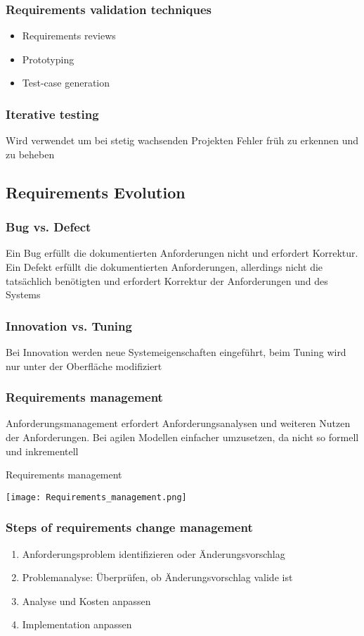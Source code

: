 \subsubsection{Requirements validation techniques}
\begin{itemize}
	\item Requirements reviews
	\item Prototyping
	\item Test-case generation
\end{itemize}
\subsubsection{Iterative testing}
Wird verwendet um bei stetig wachsenden Projekten Fehler früh zu erkennen und zu beheben
\subsection{Requirements Evolution}
\subsubsection{Bug vs. Defect}
Ein Bug erfüllt die dokumentierten Anforderungen nicht und erfordert Korrektur. Ein Defekt erfüllt die dokumentierten Anforderungen, allerdings nicht die tatsächlich benötigten und erfordert Korrektur der Anforderungen und des Systems
\subsubsection{Innovation vs. Tuning}
Bei Innovation werden neue Systemeigenschaften eingeführt, beim Tuning wird nur unter der Oberfläche modifiziert
\subsubsection{Requirements management}
Anforderungsmanagement erfordert Anforderungsanalysen und weiteren Nutzen der Anforderungen. Bei agilen Modellen einfacher umzusetzen,  da nicht so formell und inkrementell 
\begin{table}[H]
\caption{Requirements management}
\texttt{[image: Requirements\_management.png]}
\end{table}
\subsubsection{Steps of requirements change management}
\begin{enumerate}
	\item Anforderungsproblem identifizieren oder Änderungsvorschlag
	\item Problemanalyse: Überprüfen, ob Änderungsvorschlag valide ist
	\item Analyse und Kosten anpassen
	\item Implementation anpassen
\end{enumerate}








 
 